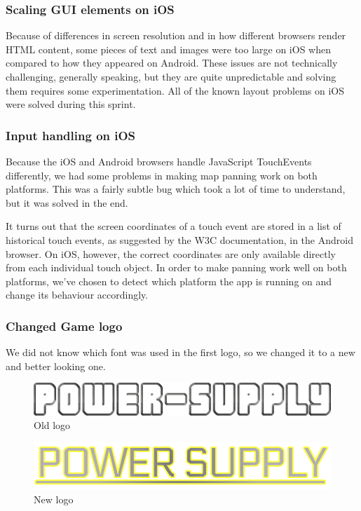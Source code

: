	\subsubsection*{Scaling GUI elements on iOS}
		Because of differences in screen resolution and in how different browsers
		render HTML content, some pieces of text and images were too large on iOS
		when compared to how they appeared on Android. These issues are not
		technically challenging, generally speaking, but they are quite
		unpredictable and solving them requires some experimentation. All of the
		known layout problems on iOS were solved during this sprint.

	\subsubsection*{Input handling on iOS}
		Because the iOS and Android browsers handle JavaScript TouchEvents
		differently, we had some problems in making map panning work on both
		platforms. This was a fairly subtle bug which took a lot of time to
		understand, but it was solved in the end.

		It turns out that the screen coordinates of a touch event are stored in
		a list of historical touch events, as suggested by the W3C
		documentation\cite{touchEventDocumentation}, in the Android browser.
		On iOS, however, the correct coordinates are only available directly from
		each individual touch object. In order to make panning work well on both
		platforms, we've chosen to detect which platform the app is running on
		and change its behaviour accordingly.

	\subsubsection*{Changed Game logo}
		We did not know which font was used in the first logo, so we changed it to a new
		and better looking one. 

		\begin{figure}
			\centering
			\includegraphics[scale=0.4]{pictures/logo2.png}
			\caption{Old logo}
		\end{figure}

		\begin{figure}
			\centering
			\includegraphics[scale=0.4]{pictures/newLogo.png}
			\caption{New logo}
		\end{figure}



